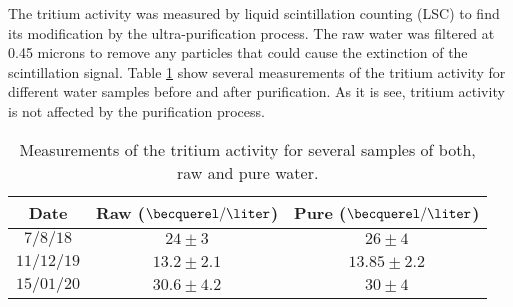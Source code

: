 The tritium activity was measured by liquid scintillation counting (LSC) to find its modification by the ultra-purification process. The raw water was filtered at 0.45 microns to remove any particles that could cause the extinction of the scintillation signal. Table \ref{tab:ActivityTritiumValues} show several measurements of the tritium activity for different water samples before and after purification. As it is see, tritium activity is not affected by the purification process.

\begin{table}[htbp]
\begin{center}
\begin{tabular}{|c|c|c|}
\hline
Date & Raw ($\becquerel/\liter$) & Pure ($\becquerel/\liter$) \\
\hline \hline \hline
$7/8/18$ & $24 \pm 3$ & $26 \pm 4$ \\ \hline
$11/12/19$ & $13.2 \pm 2.1$ & $13.85 \pm 2.2$ \\ \hline
$15/01/20$ & $30.6 \pm 4.2$ & $30 \pm 4$ \\ \hline
\end{tabular}
\caption{Measurements of the tritium activity for several samples of both, raw and pure water.}
\label{tab:ActivityTritiumValues}
\end{center}
\end{table}	